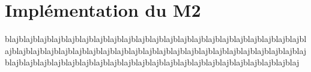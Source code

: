 \chapter{Implémentation du M2}
blajblajblajblajblajblajblajblajblajblajblajblajblajblajblajblajblajblajblajblajblajblajblajblajblajblajblajblajblajblajblajblajblajblajblajblajblajblajblajblajblajblajblajblajblajblajblajblajblajblajblajblajblajblajblajblajblajblajblajblajblajblajblajblaj
